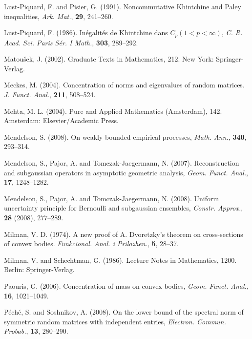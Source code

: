 \documentclass[10pt, openany]{book}
\theoremstyle{remark}
\begin{document}
\begin{thebibliography}{}
 Lust-Piquard, F. and Pisier, G. (1991).
  \newblock Noncommutative Khintchine and Paley inequalities,
  {\em Ark. Mat.}, {\bf 29}, 241--260. 
  
 Lust-Piquard, F. (1986).
  \newblock In\'egalit\'es de Khintchine dans $C_p (1<p<\infty)$,
  {\em C. R. Acad. Sci. Paris S\'er. I Math.}, {\bf 303}, 289--292. 
  
 Matou\v{s}ek, J. (2002).
  Graduate Texts in Mathematics, 212. 
  New York: Springer-Verlag.
  
 Meckes, M. (2004).
  \newblock Concentration of norms and eigenvalues of random matrices.  
  {\em J. Funct. Anal.}, {\bf 211}, 508--524.

 Mehta, M. L. (2004). 
  Pure and Applied Mathematics (Amsterdam), 142. 
  Amsterdam: Elsevier/Academic Press.
  
 Mendelson, S. (2008).
  \newblock On weakly bounded empirical processes,
  {\em Math. Ann.}, {\bf 340}, 293--314.

 Mendelson, S., Pajor, A. and Tomczak-Jaegermann, N. (2007).
  \newblock Reconstruction and subgaussian operators in asymptotic geometric analysis,  
  {\em Geom. Funct. Anal.}, {\bf 17}, 1248--1282.

Mendelson, S., Pajor, A. and Tomczak-Jaegermann, N. (2008).
  \newblock Uniform uncertainty principle for Bernoulli and subgaussian ensembles,
  {\em Constr. Approx.}, {\bf 28} (2008), 277--289. 
 
 Milman, V. D. (1974).
  \newblock A new proof of A. Dvoretzky's theorem on cross-sections of convex bodies. 
  {\em Funkcional. Anal. i Prilozhen.}, {\bf 5}, 28--37. 
  
 Milman, V. and Schechtman, G. (1986). 
  Lecture Notes in Mathematics, 1200. 
  Berlin: Springer-Verlag.
  
 Paouris, G. (2006).
  \newblock Concentration of mass on convex bodies,  
  {\em Geom. Funct. Anal.}, {\bf 16}, 1021--1049.
  
 P\'ech\'e, S. and Soshnikov, A. (2008).
  \newblock On the lower bound of the spectral norm of symmetric random matrices with independent entries,
  {\em Electron. Commun. Probab.}, {\bf 13}, 280--290. 


\end{thebibliography}
\end{document}
